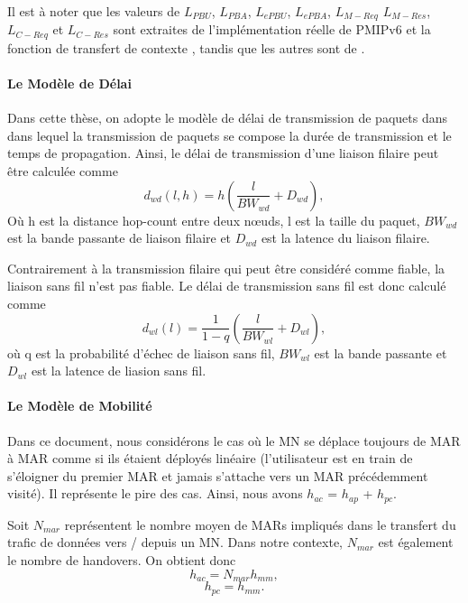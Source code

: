 Il est à noter que les valeurs de $L_{PBU}$,  $L_{PBA}$, $L_{ePBU}$, $L_{ePBA}$, $L_{M-Req}$ $L_{M-Res}$, $L_{C-Req}$ et $L_{C-Res}$ sont extraites de l'implémentation réelle de PMIPv6 \cite{oai_pmip} et la fonction de transfert de contexte \cite{D4.4}, tandis que les autres sont de \cite{HO_comparison_Lee, DMM_analysis_Hassan}.

\paragraph{Le Modèle de Délai}
Dans cette thèse, on adopte le modèle de délai de transmission de paquets dans \cite{packet_transmission_delay} dans lequel la transmission de paquets se compose la durée de transmission et le temps de propagation.
Ainsi, le délai de transmission d'une liaison filaire peut être calculée comme \\
\begin{equation}
d_{wd}(l,h) = h (\dfrac{l}{BW_{wd}} + D_{wd}),
\end{equation}
Où h est la distance hop-count entre deux nœuds, l est la taille du paquet, $ BW_{wd} $ est la bande passante de liaison filaire et $ D_{wd} $ est la latence du liaison filaire.

Contrairement à la transmission filaire qui peut être considéré comme fiable, la liaison sans fil n'est pas fiable. Le délai de transmission sans fil est donc calculé comme \cite{packet_transmission_delay} \\
\begin{equation}
d_{wl}(l) = \dfrac{1}{1-q} (\dfrac{l}{BW_{wl}} + D_{wl}),
\end{equation} 
où q est la probabilité d'échec de liaison sans fil, $ BW_{wl} $ est la bande passante et $ D_{wl} $ est la latence de liasion sans fil.

\paragraph{Le Modèle de Mobilité}
Dans ce document, nous considérons le cas où le MN se déplace toujours de MAR à MAR comme si ils étaient déployés linéaire (l'utilisateur est en train de s'éloigner du premier MAR et jamais s'attache vers un MAR précédemment visité). Il représente le pire des cas. Ainsi, nous avons
$h_{ac}$ = $h_{ap}$ + $h_{pc}$.

Soit $ N_{mar} $ représentent le nombre moyen de MARs impliqués dans le transfert du trafic de données vers / depuis un MN. Dans notre contexte, $ N_{mar} $ est également le nombre de handovers. On obtient donc \\
\begin{equation}
h_{ac} = N_{mar} h_{mm},
\end{equation} 
\begin{equation}
h_{pc} = h_{mm}.
\end{equation}

